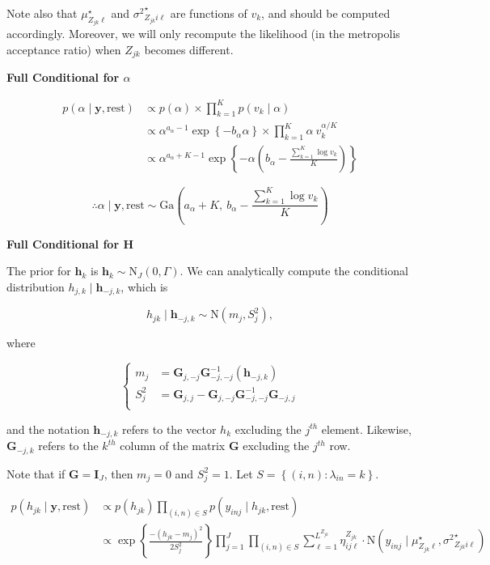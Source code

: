 \documentclass[12pt,]{article}
\newcommand{\p}[1]{\left(#1\right)}
\newcommand{\bc}[1]{ \left\{#1\right\} }
\newcommand{\N}{ \mathcal{N} }
\newcommand{\I}{\mathrm{\mathbf{I}}}
\def\N{\text{N}}
\def\G{\text{Ga}}
\def\lin{\lambda_{in}}
\def\y{\bm{y}}
\def\mus{\mu^\star}
\def\sss{{\sigma^2}^\star}
\def\rest{\text{rest}}
\def\h{\bm{h}}
\begin{document}
Note also that \(\mus_{Z_{jk}\ell}\) and \(\sss_{Z_{jk}i\ell}\) are
functions of \(v_k\), and should be computed accordingly. Moreover, we
will only recompute the likelihood (in the metropolis acceptance ratio)
when \(Z_{jk}\) becomes different.
\vspace{2em}


\textbf{Full Conditional for $\alpha$}

\begin{align*}
p(\alpha \mid \y, \rest) &\propto p(\alpha) \times \prod_{k=1}^K p(v_k \mid \alpha) \\
&\propto \alpha^{a_\alpha - 1} \exp\bc{-b_\alpha \alpha} \times \prod_{k=1}^K 
\alpha~v_k^{\alpha/K} \\
&\propto \alpha^{a_\alpha + K -1} \exp\bc{-\alpha\p{b_\alpha - 
\frac{\sum_{k=1}^K \log v_k}{K}}}
\end{align*}

\[
\therefore \alpha \mid \y, \rest \sim 
\G\p{a_\alpha + K,~ b_\alpha - \frac{\sum_{k=1}^K \log v_k}{K}}
\]
\vspace{2em}


\textbf{Full Conditional for $\bm H$}

The prior for \(\h_k\) is \(\h_k \sim \N_J(0, \Gamma)\). We can
analytically compute the conditional distribution
\(h_{j,k} \mid \h_{-j,k}\), which is

\[
h_{jk}  \mid \h_{-j,k} \sim \N(m_j, S^2_j),
\]

where

\[
\begin{cases}
m_j &= \bm G_{j,-j} \bm G_{-j,-j}^{-1}(\h_{-j,k})\\
S_j^2 &= \bm G_{j,j} - \bm G_{j,-j}\bm G_{-j,-j}^{-1}\bm G_{-j,j}\\
\end{cases}
\]

and the notation \(\h_{-j,k}\) refers to the vector \(h_k\) excluding
the \(j^{th}\) element. Likewise, \(\bm G_{-j,k}\) refers to the
\(k^{th}\) column of the matrix \(\bm G\) excluding the \(j^{th}\) row.

Note that if \(\bm G = \I_J\), then \(m_j=0\) and \(S_j^2 = 1\). Let
\(S = \bc{(i,n)\colon \lin=k}\).

\begin{align*}
p(h_{jk} \mid \y, \rest)  &\propto p(h_{jk}) \prod_{(i,n) \in S} p(y_{inj} \mid h_{jk}, \rest) \\
%
&\propto
\exp\bc{\frac{-(h_{jk} - m_j)^2}{2S_j^2}}
 \prod_{j=1}^J \prod_{(i,n)\in S}
\sum_{\ell=1}^{L^{Z_{jk}}} \eta^{Z_{jk}}_{ij\ell} \cdot
\N(y_{inj} \mid \mus_{Z_{jk}\ell}, \sss_{Z_{jk}i\ell})
\end{align*}
\end{document}

